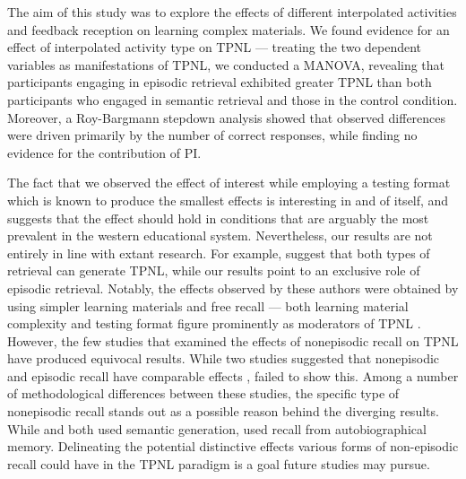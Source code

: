 \documentclass[../main.tex]{subfiles}
\begin{document}
The aim of this study was to explore the effects of different interpolated 
activities and feedback reception on learning complex materials. We found 
evidence for an effect of interpolated activity type on TPNL — treating the 
two dependent variables as manifestations of TPNL, we conducted a MANOVA, 
revealing that participants engaging in episodic retrieval exhibited greater 
TPNL than both participants who engaged in semantic retrieval and those in 
the control condition. Moreover, a Roy-Bargmann stepdown analysis showed 
that observed differences were driven primarily by the number of correct 
responses, while finding no evidence for the contribution of PI.

The fact that we observed the effect of interest while employing a testing 
format which is known to produce the smallest effects is interesting in and 
of itself, and suggests that the effect should hold in conditions that are 
arguably the most prevalent in the western educational system. Nevertheless, 
our results are not entirely in line with extant research. For example, 
\cite{pastotterRetrievalLearningFacilitates2011} suggest that both types of 
retrieval can generate TPNL, while our results point to an exclusive role of 
episodic retrieval. Notably, the effects observed by these authors were 
obtained by using simpler learning materials and free recall — both learning 
material complexity and testing format figure prominently as moderators of 
TPNL \citep{chanRetrievalPotentiatesNew2018}. However, the few studies that 
examined the effects of nonepisodic recall on TPNL have produced equivocal 
results. While two studies suggested that nonepisodic and episodic recall 
have comparable effects \citep{divisRetrievalSpeedsContext2014, 
pastotterRetrievalLearningFacilitates2011}, 
\cite{weinsteinNotAllRetrieval2015} failed to show this. Among a number of 
methodological differences between these studies, the specific type of 
nonepisodic recall stands out as a possible reason behind the diverging 
results. While \cite{pastotterRetrievalLearningFacilitates2011} and 
\cite{divisRetrievalSpeedsContext2014} both used semantic generation, 
\cite{weinsteinNotAllRetrieval2015} used recall from autobiographical 
memory. Delineating the potential distinctive effects various forms of 
non-episodic recall could have in the TPNL paradigm is a goal future studies 
may pursue.
\end{document}
